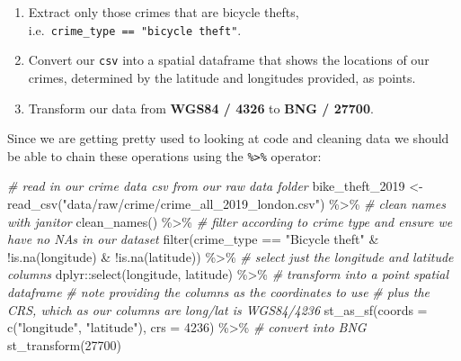 \documentclass[
]{book}
\newenvironment{Shaded}{\begin{snugshade}}{\end{snugshade}}
\newcommand{\AttributeTok}[1]{\textcolor[rgb]{0.77,0.63,0.00}{#1}}
\newcommand{\CommentTok}[1]{\textcolor[rgb]{0.56,0.35,0.01}{\textit{#1}}}
\newcommand{\DecValTok}[1]{\textcolor[rgb]{0.00,0.00,0.81}{#1}}
\newcommand{\FunctionTok}[1]{\textcolor[rgb]{0.00,0.00,0.00}{#1}}
\newcommand{\NormalTok}[1]{#1}
\newcommand{\OtherTok}[1]{\textcolor[rgb]{0.56,0.35,0.01}{#1}}
\newcommand{\SpecialCharTok}[1]{\textcolor[rgb]{0.00,0.00,0.00}{#1}}
\newcommand{\StringTok}[1]{\textcolor[rgb]{0.31,0.60,0.02}{#1}}
\providecommand{\tightlist}{%
  \setlength{\itemsep}{0pt}\setlength{\parskip}{0pt}}
\begin{document}
\begin{enumerate}
\def\labelenumi{\arabic{enumi}.}
\tightlist
\item
  Extract only those crimes that are bicycle thefts, i.e.~\texttt{crime\_type\ ==\ "bicycle\ theft"}.
\item
  Convert our \texttt{csv} into a spatial dataframe that shows the locations of our crimes, determined by the latitude and longitudes provided, as points.
\item
  Transform our data from \textbf{WGS84 / 4326} to \textbf{BNG / 27700}.
\end{enumerate}

Since we are getting pretty used to looking at code and cleaning data we should be able to chain these operations using the \texttt{\%\textgreater{}\%} operator:

\begin{Shaded}
\begin{Highlighting}[]
\CommentTok{\# read in our crime data csv from our raw data folder}
\NormalTok{bike\_theft\_2019 }\OtherTok{\textless{}{-}} \FunctionTok{read\_csv}\NormalTok{(}\StringTok{"data/raw/crime/crime\_all\_2019\_london.csv"}\NormalTok{) }\SpecialCharTok{\%\textgreater{}\%} 
  \CommentTok{\# clean names with janitor}
  \FunctionTok{clean\_names}\NormalTok{() }\SpecialCharTok{\%\textgreater{}\%}
  \CommentTok{\# filter according to crime type and ensure we have no NAs in our dataset}
  \FunctionTok{filter}\NormalTok{(crime\_type }\SpecialCharTok{==} \StringTok{"Bicycle theft"} \SpecialCharTok{\&} \SpecialCharTok{!}\FunctionTok{is.na}\NormalTok{(longitude) }\SpecialCharTok{\&} \SpecialCharTok{!}\FunctionTok{is.na}\NormalTok{(latitude)) }\SpecialCharTok{\%\textgreater{}\%} 
  \CommentTok{\# select just the longitude and latitude columns}
\NormalTok{  dplyr}\SpecialCharTok{::}\FunctionTok{select}\NormalTok{(longitude, latitude) }\SpecialCharTok{\%\textgreater{}\%}
  \CommentTok{\# transform into a point spatial dataframe}
  \CommentTok{\# note providing the columns as the coordinates to use}
  \CommentTok{\# plus the CRS, which as our columns are long/lat is WGS84/4236}
  \FunctionTok{st\_as\_sf}\NormalTok{(}\AttributeTok{coords =} \FunctionTok{c}\NormalTok{(}\StringTok{"longitude"}\NormalTok{, }\StringTok{"latitude"}\NormalTok{), }\AttributeTok{crs =} \DecValTok{4236}\NormalTok{) }\SpecialCharTok{\%\textgreater{}\%} 
  \CommentTok{\# convert into BNG}
  \FunctionTok{st\_transform}\NormalTok{(}\DecValTok{27700}\NormalTok{)}
\end{Highlighting}
\end{Shaded}
\end{document}
